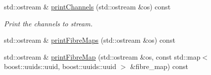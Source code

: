 \begin{DoxyCompactItemize}
std\-::ostream \& \hyperlink{classcryomesh_1_1structures_1_1Bundle_ad794a923f68c51c5c1ac4588586b6be7}{print\-Channels} (std\-::ostream \&os) const 
\begin{DoxyCompactList}\small\item\em \-Print the channels to stream. \end{DoxyCompactList}\item 
std\-::ostream \& \hyperlink{classcryomesh_1_1structures_1_1Bundle_ab7308eec882450980ebfbb7167a3538d}{print\-Fibre\-Maps} (std\-::ostream \&os) const 
\item 
std\-::ostream \& \hyperlink{classcryomesh_1_1structures_1_1Bundle_a6a6110f318167f4cc82ab6736e291628}{print\-Fibre\-Map} (std\-::ostream \&os, const std\-::map$<$ boost\-::uuids\-::uuid, boost\-::uuids\-::uuid $>$ \&fibre\-\_\-map) const 
\end{DoxyCompactItemize}

